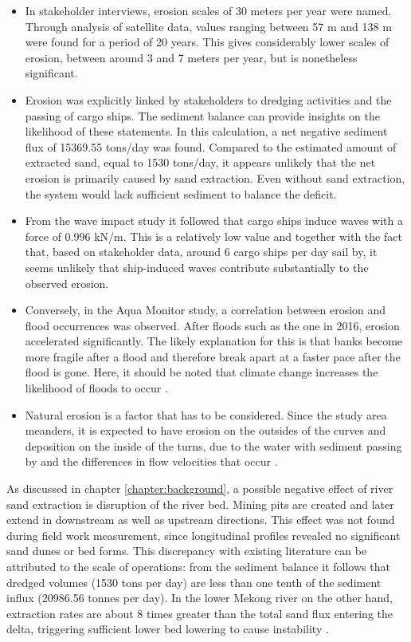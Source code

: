 \begin{itemize}
    \item In stakeholder interviews, erosion scales of 30 meters per year were named. Through analysis of satellite data, values ranging between 57 m and 138 m were found for a period of 20 years. This gives considerably lower scales of erosion, between around 3 and 7 meters per year, but is nonetheless significant.
    \item Erosion was explicitly linked by stakeholders to dredging activities and the passing of cargo ships. The sediment balance can provide insights on the likelihood of these statements. In this calculation, a net negative sediment flux of 15369.55 tons/day was found. Compared to the estimated amount of extracted sand, equal to 1530 tons/day, it appears unlikely that the net erosion is primarily caused by sand extraction. Even without sand extraction, the system would lack sufficient sediment to balance the deficit.
    \item From the wave impact study it followed that cargo ships induce waves with a force of 0.996 kN/m. This is a relatively low value and together with the fact that, based on stakeholder data, around 6 cargo ships per day sail by, it seems unlikely that ship-induced waves contribute substantially to the observed erosion.
    \item Conversely, in the Aqua Monitor study, a correlation between erosion and flood occurrences was observed. After floods such as the one in 2016, erosion accelerated significantly. The likely explanation for this is that banks become more fragile after a flood and therefore break apart at a faster pace after the flood is gone. Here, it should be noted that climate change increases the likelihood of floods to occur \autocite{usenvironmentalprotectionagencyClimateChangeIndicators2016}.
    \item Natural erosion is a factor that has to be considered. Since the study area meanders, it is expected to have erosion on the outsides of the curves and deposition on the inside of the turns, due to the water with sediment passing by and the differences in flow velocities that occur \autocite{niWhyRiversCurve2025}.
\end{itemize}

As discussed in chapter \ref{chapter:background}, a possible negative effect of river sand extraction is disruption of the river bed. Mining pits are created and later extend in downstream as well as upstream directions. This effect was not found during field work measurement, since longitudinal profiles revealed no significant sand dunes or bed forms. This discrepancy with existing literature can be attributed to the scale of operations: from the sediment balance it follows that dredged volumes (1530 tons per day) are less than one tenth of the sediment influx (20986.56 tonnes per day). In the lower Mekong river on the other hand, extraction rates are about 8 times greater than the total sand flux entering the delta, triggering sufficient lower bed lowering to cause instability \autocite{hackneyRiverBankInstability2020}.

